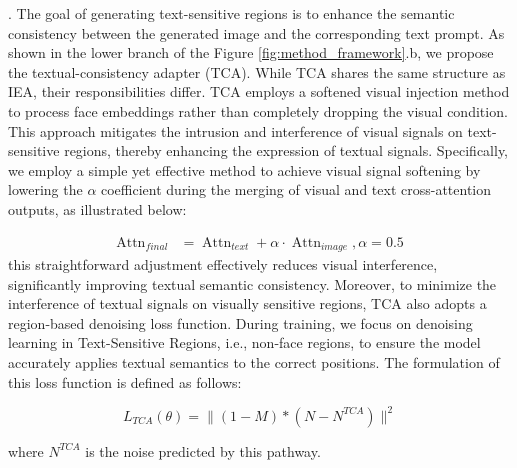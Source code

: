 . The goal of generating text-sensitive regions is to enhance the semantic consistency between the generated image and the corresponding text prompt. As shown in the lower branch of the Figure \ref{fig:method_framework}.b, we propose the textual-consistency adapter (TCA). While TCA shares the same structure as IEA, their responsibilities differ. TCA employs a softened visual injection method to process face embeddings rather than completely dropping the visual condition. This approach mitigates the intrusion and interference of visual signals on text-sensitive regions, thereby enhancing the expression of textual signals. Specifically, we employ a simple yet effective method to achieve visual signal softening by lowering the $\alpha$ coefficient during the merging of visual and text cross-attention outputs, as illustrated below:

\begin{align}
    \operatorname{Attn}_{final} &= \operatorname{Attn}_{text} + \alpha \cdot \operatorname{Attn}_{image}, \alpha = 0.5
     \label{eq:alpha}
\end{align}
this straightforward adjustment effectively reduces visual interference, significantly improving textual semantic consistency. Moreover, to minimize the interference of textual signals on visually sensitive regions, TCA also adopts a region-based denoising loss function. During training, we focus on denoising learning in Text-Sensitive Regions, i.e., non-face regions, to ensure the model accurately applies textual semantics to the correct positions. The formulation of this loss function is defined as follows:


\begin{equation}
    L_{TCA}(\theta) = \lVert (1-M) * (N - N^{TCA})\rVert^2 
    \label{eq:IEA}
\end{equation}

where $N^{TCA}$ is the noise predicted by this pathway.





